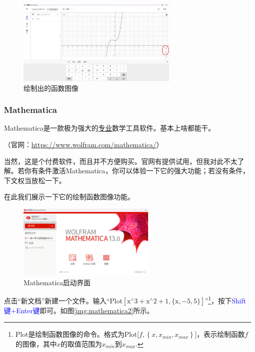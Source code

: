 \documentclass[lang=cn,math=cm,chinesefont=nofont,11pt,scheme=chinese,onecol]{elegantbook}
\begin{document}
\begin{figure}[h]
  \centering
  \includegraphics[width=0.7\textwidth]{image/geogebra4.png}
  \caption{绘制出的函数图像}
  \label{img:geogebra4}
\end{figure}

\subsubsection{Mathematica}

Mathematica是一款极为强大的\underline{专业}数学工具软件。基本上啥都能干。

（官网：\href{https://www.wolfram.com/mathematica/}{https://www.wolfram.com/mathematica/}）

当然，这是个付费软件，而且并不方便购买。官网有提供试用，但我对此不太了解。若你有条件激活Mathematica，你可以体验一下它的强大功能；若没有条件，下文权当放松一下。

在此我们展示一下它的绘制函数图像功能。

\begin{figure}[h]
  \centering
  \includegraphics[width=0.6\textwidth]{image/mathematica1.png}
  \caption{Mathematica启动界面}
  \label{img:mathematica1}
\end{figure}

点击“新文档”新建一个文件。输入“Plot$\left[\text{x}^{\land}3+\text{x}^{\land}2+1,\{\text{x},-5,5\}\right]$”\footnote{Plot是绘制函数图像的命令。格式为Plot[$f,\left\{x,x_{min},x_{max}\right\}$]，表示绘制函数$f$的图像，其中$x$的取值范围为$x_{min}$到$x_{max}$.}，按下\textcolor{blue}{Shift键+Enter键}即可。如图\ref{img:mathematica2}所示。
\end{document}
